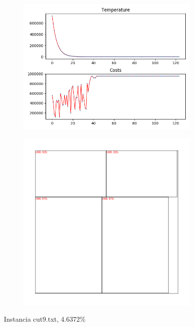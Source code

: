 \begin{figure}
\centering
\begin{subfigure}{.5\textwidth}
  \centering
  \includegraphics[width=1\linewidth]{results/cut9/1/plot}
  \label{fig:sub1}
\end{subfigure}%
\begin{subfigure}{.5\textwidth}
  \centering
  \includegraphics[width=1\linewidth]{results/cut9/1/cut}
  \label{fig:sub2}
\end{subfigure}
\caption{Instancia cut9.txt, 4.6372\%}
\label{fig:test}
\end{figure}

